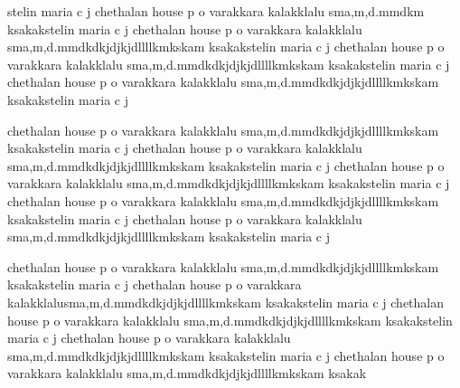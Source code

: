 \documentclass{article}
\begin{document}
stelin maria c j chethalan house p o varakkara kalakklalu
sma,m,d.mmdkm ksakakstelin maria c j chethalan house p o varakkara kalakklalu
sma,m,d.mmdkdkjdjkjdllllkmkskam ksakakstelin maria c j chethalan house p o varakkara kalakklalu
sma,m,d.mmdkdkjdjkjdllllkmkskam ksakakstelin maria c j chethalan house p o varakkara kalakklalu
sma,m,d.mmdkdkjdjkjdllllkmkskam ksakakstelin maria c j


 chethalan house p o varakkara kalakklalu
sma,m,d.mmdkdkjdjkjdllllkmkskam ksakakstelin maria c j chethalan house p o varakkara kalakklalu
sma,m,d.mmdkdkjdjkjdllllkmkskam ksakakstelin maria c j chethalan house p o varakkara kalakklalu
sma,m,d.mmdkdkjdjkjdllllkmkskam ksakakstelin maria c j chethalan house p o varakkara kalakklalu
sma,m,d.mmdkdkjdjkjdllllkmkskam ksakakstelin maria c j chethalan house p o varakkara kalakklalu
sma,m,d.mmdkdkjdjkjdllllkmkskam ksakakstelin maria c j

 chethalan house p o varakkara kalakklalu
sma,m,d.mmdkdkjdjkjdllllkmkskam ksakakstelin maria c j chethalan house p o varakkara kalakklalusma,m,d.mmdkdkjdjkjdllllkmkskam ksakakstelin maria c j chethalan house p o varakkara kalakklalu
sma,m,d.mmdkdkjdjkjdllllkmkskam ksakakstelin maria c j chethalan house p o varakkara kalakklalu
sma,m,d.mmdkdkjdjkjdllllkmkskam ksakakstelin maria c j chethalan house p o varakkara kalakklalu
sma,m,d.mmdkdkjdjkjdllllkmkskam ksakak
\end{document}
